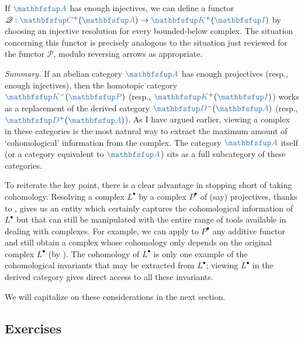 If $\categ{A}$ has enough injectives, we can define a functor
$\mathscr{Q} : \categ{C}^+(\categ{A}) \to \categ{K}^+(\categ{I})$ by
choosing an injective resolution for every bounded-below complex.  The
situation concerning this functor is precisely analogous to the
situation just reviewed for the functor $\mathscr{P}$, modulo
reversing arrows as appropriate.

\emph{Summary.} If an abelian category $\categ{A}$ has enough
projectives (resp., enough injectives), then the homotopic category
$\categ{K}^-(\categ{P})$ (resp., $\categ{K}^+(\categ{I})$) works as a
replacement of the derived category $\categ{D}^-(\categ{A})$ (resp.,
$\categ{D}^+(\categ{A})$). As I have argued earlier, viewing a complex
in these categories is the most natural way to extract the maximum
amount of `cohomological' information from the complex. The category
$\categ{A}$ itself (or a category equivalent to $\categ{A}$) sits as a
full subcategory of these categories.

To reiterate the key point, there is a clear advantage in stopping
short of taking cohomology. Resolving a complex $L^\bullet$ by a
complex $P^\bullet$ of (say) projectives, thanks to
, gives us an entity which certainly
captures the cohomological information of $L^\bullet$ but that can
still be manipulated with the entire range of tools available in
dealing with complexes. For example, we can apply to $P^\bullet$ any
additive functor and still obtain a complex whose cohomology only
depends on the original complex $L^\bullet$ (by
). The cohomology of $L^\bullet$ is only one example
of the cohomological invariants that may be extracted from
$L^\bullet$; viewing $L^\bullet$ in the derived category gives direct
access to all these invariants.

We will capitalize on these considerations in the next section.

\subsection*{Exercises}

